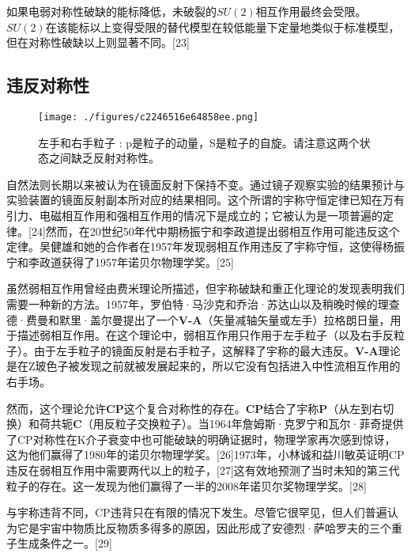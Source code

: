 如果电弱对称性破缺的能标降低，未破裂的$SU(2)$相互作用最终会受限。$SU(2)$在该能标以上变得受限的替代模型在较低能量下定量地类似于标准模型，但在对称性破缺以上则显著不同。[23]

\subsection{违反对称性}
\begin{figure}[ht]
\centering
\texttt{[image: ./figures/c2246516e64858ee.png]}
\caption{左手和右手粒子 : p是粒子的动量，S是粒子的自旋。请注意这两个状态之间缺乏反射对称性。} \label{fig_RXHZY_7}
\end{figure}
自然法则长期以来被认为在镜面反射下保持不变。通过镜子观察实验的结果预计与实验装置的镜面反射副本所对应的结果相同。这个所谓的宇称守恒定律已知在万有引力、电磁相互作用和强相互作用的情况下是成立的；它被认为是一项普遍的定律。[24]然而，在20世纪50年代中期杨振宁和李政道提出弱相互作用可能违反这个定律。吴健雄和她的合作者在1957年发现弱相互作用违反了宇称守恒，这使得杨振宁和李政道获得了1957年诺贝尔物理学奖。[25]

虽然弱相互作用曾经由费米理论所描述，但宇称破缺和重正化理论的发现表明我们需要一种新的方法。1957年，罗伯特·马沙克和乔治·苏达山以及稍晚时候的理查德·费曼和默里·盖尔曼提出了一个\textbf{V-A}（矢量减轴矢量或左手）拉格朗日量，用于描述弱相互作用。在这个理论中，弱相互作用只作用于左手粒子（以及右手反粒子）。由于左手粒子的镜面反射是右手粒子，这解释了宇称的最大违反。\textbf{V-A}理论是在Z玻色子被发现之前就被发展起来的，所以它没有包括进入中性流相互作用的右手场。

然而，这个理论允许\textbf{CP}这个复合对称性的存在。\textbf{CP}结合了宇称\textbf{P}（从左到右切换）和荷共轭\textbf{C}（用反粒子交换粒子）。当1964年詹姆斯·克罗宁和瓦尔·菲奇提供了CP对称性在K介子衰变中也可能破缺的明确证据时，物理学家再次感到惊讶，这为他们赢得了1980年的诺贝尔物理学奖。[26]1973年，小林诚和益川敏英证明CP违反在弱相互作用中需要两代以上的粒子，[27]这有效地预测了当时未知的第三代粒子的存在。这一发现为他们赢得了一半的2008年诺贝尔奖物理学奖。[28]

与宇称违背不同，CP违背只在有限的情况下发生。尽管它很罕见，但人们普遍认为它是宇宙中物质比反物质多得多的原因，因此形成了安德烈·萨哈罗夫的三个重子生成条件之一。[29]